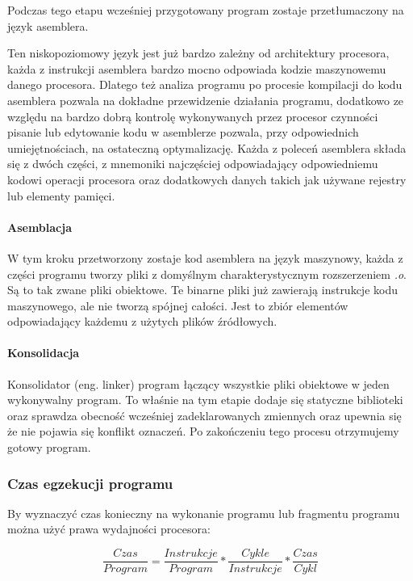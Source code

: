 \documentclass[a4paper,12pt]{article}
\begin{document}
Podczas tego etapu wcześniej przygotowany program zostaje przetłumaczony na język asemblera. 

Ten niskopoziomowy język jest już bardzo zależny od architektury procesora, każda z  instrukcji asemblera bardzo mocno odpowiada kodzie maszynowemu danego procesora. 
Dlatego też analiza programu po procesie kompilacji do kodu asemblera pozwala na dokładne przewidzenie działania programu, dodatkowo
ze względu na bardzo dobrą kontrolę wykonywanych przez procesor czynności pisanie lub edytowanie kodu w asemblerze pozwala, przy odpowiednich umiejętnościach, na ostateczną optymalizację. 
Każda z poleceń asemblera składa się z dwóch części, z mnemoniki najczęściej odpowiadający odpowiedniemu kodowi operacji procesora oraz dodatkowych danych takich jak używane rejestry lub elementy pamięci. 

\paragraph{Asemblacja}

W tym kroku przetworzony zostaje kod asemblera na język maszynowy, każda z części programu tworzy pliki z domyślnym charakterystycznym rozszerzeniem \textit{.o}.
Są to tak zwane pliki obiektowe.
Te binarne pliki już zawierają instrukcje kodu maszynowego, ale nie tworzą spójnej całości. Jest to zbiór elementów odpowiadający każdemu z użytych plików źródłowych.

\paragraph{Konsolidacja}
Konsolidator (eng. linker) program łączący wszystkie pliki obiektowe w jeden wykonywalny program. To właśnie na tym etapie dodaje się statyczne biblioteki oraz sprawdza obecność wcześniej zadeklarowanych zmiennych oraz upewnia się że nie pojawia się konflikt oznaczeń. Po zakończeniu tego procesu otrzymujemy gotowy program. 


\subsubsection{Czas egzekucji programu}

By wyznaczyć czas konieczny na wykonanie programu lub fragmentu programu można użyć prawa wydajności procesora\cite{arch}:

\begin{equation}
        \label{Iron Law}
        \frac{Czas}{Program} =  \frac{Instrukcje}{Program} * \frac{Cykle}{Instrukcje} * \frac{Czas}{Cykl}
\end{equation}
\end{document}
